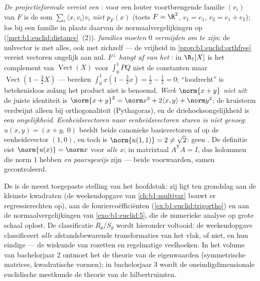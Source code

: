 \begin{remark}
\label{rem:b1:euclid:pitfalls}
\emph{De projectieformule vereist een  }: voor een
louter voortbrengende familie $(v_i)$ van $F$ is de som
$\sum_i\langle x, v_i\rangle v_i$ \emph{niet} $p_F(x)$ (toets $F =
\R^2$, $v_1 = e_1$, $v_2 = e_1 + e_2$); los bij een
 familie in plaats daarvan de
normaalvergelijkingen op (\cref{met:b1:euclid:distance}~(2)).
\emph{ families moeten $0$ vermijden om  te zijn}:
de nulvector is  met alles, ook met zichzelf --- de
vrijheid in \cref{prop:b1:euclid:orthfree} vereist vectoren
ongelijk aan nul.
\emph{$F^\perp$ hangt af van het }: in $\R_1[X]$
is het complement van $\operatorname{Vect}(X)$ voor $\int_0^1 PQ$
niet de constanten maar $\operatorname{Vect}(1 - \frac32 X)$ ---
bereken $\int_0^1 x(1 - \frac32 x) = \frac12 - \frac12 = 0$;
``loodrecht'' is betekenisloos zolang het product niet is
benoemd.
\emph{Werk $\norm{x + y}$ niet  uit}: de juiste identiteit
is $\norm{x+y}^2 = \norm x^2 + 2\langle x, y\rangle + \norm y^2$;
de kruisterm verdwijnt alleen bij orthogonaliteit (Pythagoras), en
de driehoeksongelijkheid is een \emph{ongelijkheid}.
\emph{Eenheidsvectoren naar eenheidsvectoren sturen is niet
genoeg}: $u(x, y) = (x + y,\ 0)$ beeldt beide canonieke
basisvectoren af op de eenheidsvector $(1, 0)$, en toch is
$\norm{u(1,1)} = 2 \neq \sqrt2$: geen . De definitie eist
$\norm{u(x)} = \norm x$ voor \emph{alle} $x$; in matrixtaal
$A^{\mathsf T}A = I$, dus kolommen die norm $1$ hebben \emph{en
paarsgewijs } zijn --- beide voorwaarden, samen
gecontroleerd.
\end{remark}

\begin{remark}
\label{rem:b1:euclid:whereused}
De  is de meest toegepaste stelling van het
hoofdstuk: zij ligt ten grondslag aan de kleinste kwadraten (de
weekendopgave van \cref{ch:b1:multivar} bouwt er regressierechten
op), aan de fouriercoëfficiënten
(\cref{ex:b1:euclid:trigortho}) en aan de normaalvergelijkingen
van \cref{exo:b1:euclid:5}, die de numerieke analyse op grote
schaal oplost. De classificatie $R_\theta / S_\theta$ wordt
hieronder voltooid: de weekendopgave classificeert \emph{alle}
afstandsbewarende transformaties van het vlak,  of niet, en
hun eindige  --- de wiskunde van rozetten en regelmatige
veelhoeken. In het volume van bachelorjaar 2 ontmoet het  de theorie van de eigenwaarden (symmetrische matrices,
kwadratische vormen); in bachelorjaar 3 wordt de
oneindigdimensionale euclidische meetkunde de theorie van de
hilbertruimten.
\end{remark}


